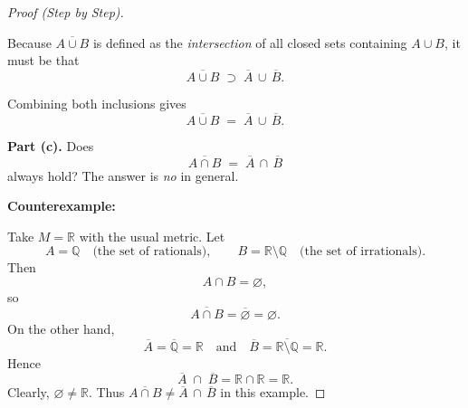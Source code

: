 \documentclass[12pt]{article}
\theoremstyle{definition} %
\theoremstyle{plain} %
\begin{document}
\begin{proof}[Proof (Step by Step)]
\begin{itemize}
                    Because $\overline{A \cup B}$ is defined as the \emph{intersection} of all closed sets containing $A \cup B$, it must be that
                    \[
                    \overline{A \cup B}
                    \;\supset\;
                    \overline{A}\,\cup\,\overline{B}.
                    \]
                    \end{itemize}
                    
                    Combining both inclusions gives
                    \[
                    \overline{A \cup B} \;=\; \overline{A}\,\cup\,\overline{B}.
                    \]
                    
                    \medskip
                    
                    \textbf{Part (c).} Does
                    \[
                    \overline{A \cap B} \;=\; \overline{A}\,\cap\,\overline{B}
                    \]
                    always hold? The answer is \emph{no} in general.
                    
                    \medskip
                    
                    \textbf{Counterexample:}
                    
                    Take $M = \mathbb{R}$ with the usual metric.  Let 
                    \[
                    A = \mathbb{Q} \quad\text{(the set of rationals)}, 
                    \qquad
                    B = \mathbb{R} \setminus \mathbb{Q} \quad\text{(the set of irrationals)}.
                    \]
                    Then 
                    \[
                    A \cap B = \varnothing,
                    \]
                    so 
                    \[
                    \overline{A \cap B} = \overline{\varnothing} = \varnothing.
                    \]
                    On the other hand,
                    \[
                    \overline{A} = \overline{\mathbb{Q}} = \mathbb{R}
                    \quad\text{and}\quad
                    \overline{B} = \overline{\mathbb{R} \setminus \mathbb{Q}} = \mathbb{R}.
                    \]
                    Hence 
                    \[
                    \overline{A} \;\cap\; \overline{B}
                    = \mathbb{R} \cap \mathbb{R}
                    = \mathbb{R}.
                    \]
                    Clearly, $\varnothing \neq \mathbb{R}$.  
                    Thus $\overline{A \cap B} \neq \overline{A}\,\cap\,\overline{B}$ in this example.
                    
                    \end{proof}
\end{document}
